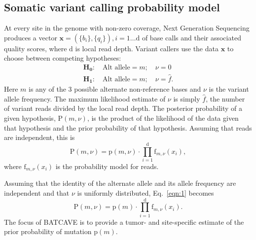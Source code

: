 \documentclass[a4,center,fleqn]{NAR}
\newcommand{\batcave}{BATCAVE\xspace}
\begin{document}
\subsection{Somatic variant calling probability model}

At every site in the genome with non-zero coverage, Next Generation Sequencing produces a vector $\mathbf{x}  = (\{b_i\},\{q_i\}), i = 1\dots \mathrm{d}$ of base calls and their associated quality scores, where $\mathrm{d}$ is local read depth.
Variant callers use the data $\mathbf{x}$ to choose between competing hypotheses:
\begin{equation}
  \label{eqn:hypothesis}
  \begin{array}{l}
    \mathbf{H_0}:\quad \textrm{Alt allele} = m;\quad\nu = 0\\
    \mathbf{H_1}:\quad \textrm{Alt allele} = m;\quad\nu = \hat{f}.
  \end{array}
\end{equation}
Here $m$ is any of the 3 possible alternate non-reference bases and $\nu$ is the variant allele frequency.
The maximum likelihood estimate of $\nu$ is simply $\hat{f}$, the number of variant reads divided by the local read depth.
The posterior probability of a given hypothesis, $\mathrm{P}(m,\nu)$, is the product of the likelihood of the data given that hypothesis and the prior probability of that hypothesis. 
Assuming that reads are independent, this is
\begin{equation}\label{eqn:1}
  \mathrm{P}(m,\nu) = \mathrm{p}(m,\nu) \cdot \prod_{i=1}^{\mathrm{d}} \textrm{f}_{m,\nu}(x_i),
\end{equation}
where $\textrm{f}_{m,\nu}(x_i)$ is the probability model for reads.

Assuming that the identity of the alternate allele and its allele frequency are independent and that $\nu$ is uniformly distributed, Eq.~\ref{eqn:1} becomes
\begin{equation}  \label{eqn:2}
  \mathrm{P}(m,\nu) = \mathrm{p}(m) \cdot \prod_{i=1}^{\mathrm{d}} \textrm{f}_{m,\nu}(x_i).
\end{equation}
The focus of \batcave is to provide a tumor- and site-specific estimate of the prior probability of mutation $\mathrm{p}(m)$.
\end{document}
